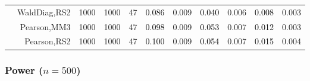 \documentclass[
]{article}
\begin{document}
\begin{table}[H]
{\begin{tabular}[t]{lrrrrrrrlrr}
\hspace{1em} & WaldDiag,RS2 & 1000 & 1000 & 47 & \textcolor{black}{0.086} & 0.009 & \textcolor{black}{0.040} & 0.006 & \textcolor{black}{0.008} & 0.003\\

\hspace{1em} & Pearson,MM3 & 1000 & 1000 & 47 & \textcolor{black}{0.098} & 0.009 & \textcolor{black}{0.053} & 0.007 & \textcolor{black}{0.012} & 0.003\\

\hspace{1em} & Pearson,RS2 & 1000 & 1000 & 47 & \textcolor{black}{0.100} & 0.009 & \textcolor{black}{0.054} & 0.007 & \textcolor{black}{0.015} & 0.004\\
\bottomrule
\end{tabular}}
\endgroup{}
\end{table}

\hypertarget{power-n500}{%
\subsubsection{\texorpdfstring{Power
(\(n=500\))}{Power (n=500)}}\label{power-n500}}
\end{document}
